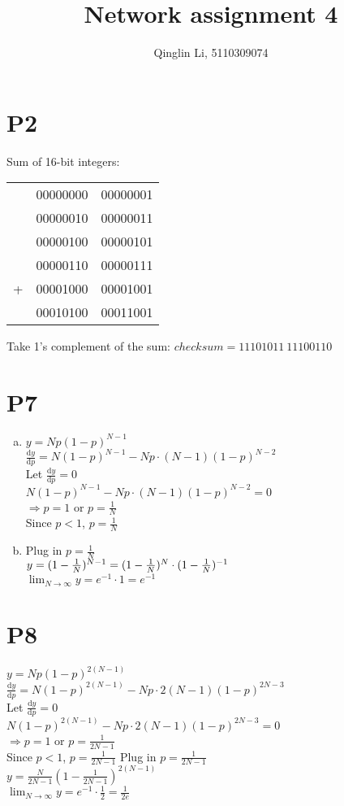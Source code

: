 \documentclass[12pt]{article}
\date{}
\title{Network assignment 4}
\author{Qinglin Li, 5110309074}
\begin{document}
\maketitle
\section*{P2}
Sum of 16-bit integers:\\

\begin{tabular}{ccc}
  & 00000000 & 00000001\\ 
  & 00000010 & 00000011\\ 
  & 00000100 & 00000101\\ 
  & 00000110 & 00000111\\ 
+ & 00001000 & 00001001\\ 
\hline
  & 00010100 & 00011001
\end{tabular} 

Take 1's complement of the sum: $checksum = 11101011~11100110$

\section*{P7}
\begin{enumerate}[(a)]
\item
$y=Np(1-p)^{N-1}$\\
$\frac{\mathrm{d}y}{\mathrm{d}p}=N(1-p)^{N-1} - Np\cdot(N-1)(1-p)^{N-2}$\\
Let $\frac{\mathrm{d}y}{\mathrm{d}p}=0$\\
$N(1-p)^{N-1} - Np\cdot(N-1)(1-p)^{N-2}=0$\\
$\Longrightarrow p = 1$ or $p=\frac{1}{N}$\\
Since $p<1$, $p = \frac{1}{N}$
\item 
Plug in $p=\frac{1}{N}$\\
$y=(1-\frac{1}{N})^{N-1}=(1-\frac{1}{N})^N\cdot (1-\frac{1}{N})^{-1}$\\
$\lim_{N\to \infty} y= e^{-1}\cdot 1 = e^{-1}$
\end{enumerate}

\section*{P8}
$y=Np(1-p)^{2(N-1)}$\\
$\frac{\mathrm{d}y}{\mathrm{d}p}=N(1-p)^{2(N-1)} - Np\cdot2(N-1)(1-p)^{2N-3}$\\
Let $\frac{\mathrm{d}y}{\mathrm{d}p}=0$\\
$N(1-p)^{2(N-1)} - Np\cdot2(N-1)(1-p)^{2N-3}=0$\\
$\Longrightarrow p = 1$ or $p=\frac{1}{2N-1}$\\
Since $p<1$, $p = \frac{1}{2N-1}$ 
Plug in $p=\frac{1}{2N-1}$\\
$y=\frac{N}{2N-1}(1-\frac{1}{2N-1})^{2(N-1)}$\\
$\lim_{N\to \infty} y= e^{-1}\cdot \frac{1}{2}= \frac{1}{2e}$
\end{document}
